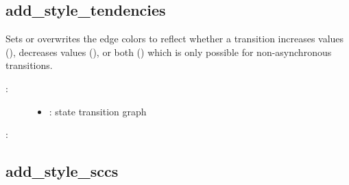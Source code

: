 \documentclass[letterpaper,10pt,english]{sphinxmanual}
\begin{document}
\subsection{add\_style\_tendencies}
\label{\detokenize{StateTransitionGraphs:id20}}\label{\detokenize{StateTransitionGraphs:add-style-tendencies}}

\begin{fulllineitems}
\label{\detokenize{StateTransitionGraphs:PyBoolNet.StateTransitionGraphs.add_style_tendencies}}
Sets or overwrites the edge colors to reflect whether a transition increases values (),
decreases values (), or both () which is only possible for non-asynchronous transitions.
\begin{description}
\item[{:}] \leavevmode\begin{itemize}
\item {} 
: state transition graph

\end{itemize}

\end{description}

:

\begin{sphinxVerbatim}[commandchars=\\\{\}]
\end{sphinxVerbatim}

\end{fulllineitems}



\subsection{add\_style\_sccs}
\label{\detokenize{StateTransitionGraphs:add-style-sccs}}\label{\detokenize{StateTransitionGraphs:stgs-add-style-sccs}}
\end{document}
